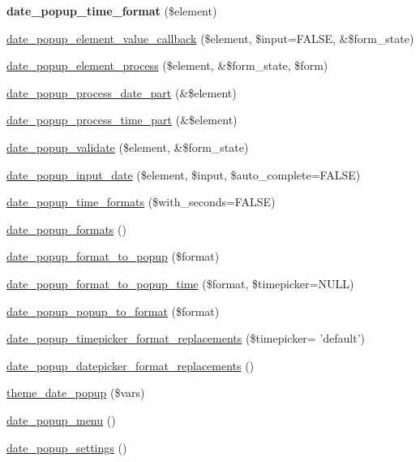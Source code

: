 \begin{DoxyCompactItemize}
\item 
\hypertarget{date__popup_8module_ae419642908f3912e1ddfb1e5171aa70a}{
{\bfseries date\_\-popup\_\-time\_\-format} (\$element)}
\label{date__popup_8module_ae419642908f3912e1ddfb1e5171aa70a}

\item 
\hyperlink{date__popup_8module_a9c101bfe3a097b79e1c97c19f8907d2b}{date\_\-popup\_\-element\_\-value\_\-callback} (\$element, \$input=FALSE, \&\$form\_\-state)
\item 
\hyperlink{date__popup_8module_a1c48e05ba3b84ea7170f70091a3893d2}{date\_\-popup\_\-element\_\-process} (\$element, \&\$form\_\-state, \$form)
\item 
\hyperlink{date__popup_8module_a63e8f88e1024d1a70aaa2a2947dded90}{date\_\-popup\_\-process\_\-date\_\-part} (\&\$element)
\item 
\hyperlink{date__popup_8module_a53fb75e9ce4c99c392db6eac983ab105}{date\_\-popup\_\-process\_\-time\_\-part} (\&\$element)
\item 
\hyperlink{date__popup_8module_ae3aefed79afb4cd23b3dc109a4c17bef}{date\_\-popup\_\-validate} (\$element, \&\$form\_\-state)
\item 
\hyperlink{date__popup_8module_ab02977100e1912ca4c4a5c8b6de75da6}{date\_\-popup\_\-input\_\-date} (\$element, \$input, \$auto\_\-complete=FALSE)
\item 
\hyperlink{date__popup_8module_ac8083952de3412b9fb7ded7bb98b47e2}{date\_\-popup\_\-time\_\-formats} (\$with\_\-seconds=FALSE)
\item 
\hyperlink{date__popup_8module_a7e2c02bedbfb8ff3d87b7e7151e72ba7}{date\_\-popup\_\-formats} ()
\item 
\hyperlink{date__popup_8module_a271d1860d9abc66d5eb49445f2c942e6}{date\_\-popup\_\-format\_\-to\_\-popup} (\$format)
\item 
\hyperlink{date__popup_8module_a93e9f2dd0ee8f2a44b99a2258c709355}{date\_\-popup\_\-format\_\-to\_\-popup\_\-time} (\$format, \$timepicker=NULL)
\item 
\hyperlink{date__popup_8module_ab3bb16ecb487ede2fef0fe0e70bf92bb}{date\_\-popup\_\-popup\_\-to\_\-format} (\$format)
\item 
\hyperlink{date__popup_8module_a979db45b845f800f2c9f2778d59edf04}{date\_\-popup\_\-timepicker\_\-format\_\-replacements} (\$timepicker= 'default')
\item 
\hyperlink{date__popup_8module_afe02f13cab50570420caf4d3f0a6d824}{date\_\-popup\_\-datepicker\_\-format\_\-replacements} ()
\item 
\hyperlink{date__popup_8module_ad97b9e4ee2f4a61297b9de0dab522671}{theme\_\-date\_\-popup} (\$vars)
\item 
\hyperlink{date__popup_8module_a720b482218ecb300ee851f77d166633d}{date\_\-popup\_\-menu} ()
\item 
\hyperlink{date__popup_8module_a29fa4cb6dcb228f28268ff94ab3ec2be}{date\_\-popup\_\-settings} ()
\end{DoxyCompactItemize}


